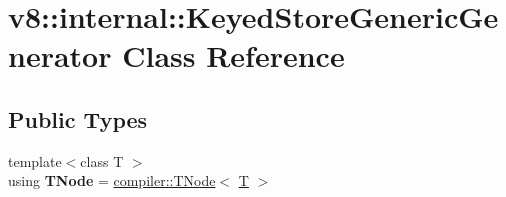 \hypertarget{classv8_1_1internal_1_1KeyedStoreGenericGenerator}{}\section{v8\+:\+:internal\+:\+:Keyed\+Store\+Generic\+Generator Class Reference}
\label{classv8_1_1internal_1_1KeyedStoreGenericGenerator}
\subsection*{Public Types}
\begin{DoxyCompactItemize}
\item 
\mbox{\label{classv8_1_1internal_1_1KeyedStoreGenericGenerator_afe7736a34a1a9de345a47e6a8d43ea96}} 
{\footnotesize template$<$class T $>$ }\\using {\bfseries T\+Node} = \mbox{\hyperlink{classv8_1_1internal_1_1compiler_1_1TNode}{compiler\+::\+T\+Node}}$<$ \mbox{\hyperlink{classv8_1_1internal_1_1torque_1_1T}{T}} $>$
\end{DoxyCompactItemize}
